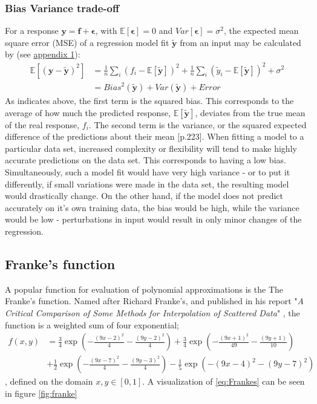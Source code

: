 \documentclass[%
oneside,                 %
final,                   %
10pt]{article}
\begin{document}
\subsubsection{Bias Variance trade-off}
\label{S:M_Biasvar}
For a response $\bm{y}=\bm{f}+\bm{\epsilon}$, with $\mathbb{E}[{\bm{\epsilon}}]=0$ and $Var[\bm{\epsilon}]=\sigma^2$, the expected mean square error (MSE) of a regression model fit $\bm{\tilde{y}}$ from an input may be calculated by (see \hyperref[APP_1]{appendix 1}):
\begin{align}
\mathbb{E}\left[(\bm{y}-\bm{\tilde{y}})^2\right]&=\frac{1}{n}\sum_i(f_i-\mathbb{E}\left[\bm{\tilde{y}}\right])^2+\frac{1}{n}\sum_i(\tilde{y}_i-\mathbb{E}\left[\bm{\tilde{y}}\right])^2+\sigma^2 \label{eq:Biasvar}\\
&=\mathit{Bias}^2(\bm{\tilde{y}})+\mathit{Var}(\bm{\tilde{y}})+Error
\end{align}
As indicates above, the first term is the squared bias. This corresponds to the average of how much the predicted response, $\mathbb{E}\left[\bm{\tilde{y}}\right]$, deviates from the true mean of the real response, $f_i$. The second term is the variance, or the squared expected difference of the predictions about their mean \citep{2017introstatlearn}[p.223]. When fitting a model to a particular data set, increased complexity or flexibility will tend to make highly accurate predictions on the data set. This corresponds to having a low bias. Simultaneously, such a model fit would have very high variance - or to put it differently, if small variations were made in the data set, the resulting model would drastically change. On the other hand, if the model does not predict accurately on it's own training data, the bias would be high, while the variance would be low - perturbations in input would result in only minor changes of the regression.

\subsection{Franke's function}
A popular function for evaluation of polynomial approximations is the The Franke's function. Named after Richard Franke's, and published in his report "\textit{A Critical Comparison of Some Methods for Interpolation of Scattered Data}" \cite{FrankeRichard1979ACCo}, the function is a weighted sum of four exponential;
\begin{equation}
\begin{split}
f(x,y) &= \frac{3}{4}\exp{\left(-\frac{(9x-2)^2}{4} - \frac{(9y-2)^2}{4}\right)}+\frac{3}{4}\exp{\left(-\frac{(9x+1)^2}{49}- \frac{(9y+1)}{10}\right)} \\
&+\frac{1}{2}\exp{\left(-\frac{(9x-7)^2}{4} - \frac{(9y-3)^2}{4}\right)} -\frac{1}{5}\exp{\left(-(9x-4)^2 - (9y-7)^2\right) }
\end{split}
\label{eq:Frankes}
\end{equation}
, defined on the domain $x,y\in [0,1]$. A visualization of \eqref{eq:Frankes} can be seen in figure \ref{fig:franke}
\end{document}
